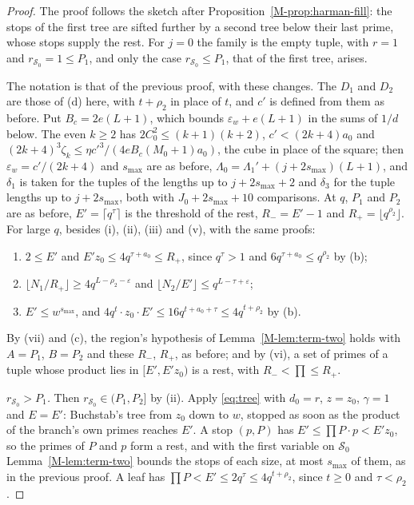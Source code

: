 \documentclass[11pt]{article}
\numberwithin{equation}{section}
\begin{document}
\begin{proof}
The proof follows the sketch after Proposition~\ref{M-prop:harman-fill}: the stops of the first tree are sifted
further by a second tree below their last prime, whose stops supply the rest. For $j = 0$ the family is the empty
tuple, with $r = 1$ and $r_{\mathcal S_0} = 1 \le P_1$, and only the case $r_{\mathcal S_0} \le P_1$, that of the first
tree, arises.

The notation is that of the previous proof, with these changes. The $D_1$ and $D_2$ are those of (d) here, with $t +
\rho_2$ in place of $t$, and $c'$ is defined from them as before. Put $B_c = 2e(L + 1)$, which bounds $\varepsilon_w +
e(L + 1)$ in the sums of $1/d$ below. The even $k \ge 2$ has $2C_0^2
\le (k + 1)(k + 2)$, $c' < (2k + 4)a_0$ and $(2k + 4)^3 \zeta_k \le \eta c'^3/(4eB_c(M_0 + 1)a_0)$, the cube in place of
the square; then $\varepsilon_w = c'/(2k + 4)$ and $s_{\max}$ are as before, $\Lambda_0 = \Lambda_1' + (j + 2s_{\max})(L
+ 1)$, and $\delta_1$ is taken for the tuples of the lengths up to $j + 2s_{\max} + 2$ and $\delta_3$ for the tuple
lengths up to $j + 2s_{\max}$, both with $J_0 + 2s_{\max} + 10$ comparisons. At $q$, $P_1$ and $P_2$ are as before, $E'
=
\lceil q^\tau \rceil$ is the threshold of the rest, $R_- = E' - 1$ and $R_+ = \lfloor q^{\rho_2} \rfloor$. For large
$q$, besides (i), (ii), (iii) and (v), with the same proofs:
\begin{enumerate}
\item[(vi)] $2 \le E'$ and $E' z_0 \le 4q^{\tau + a_0} \le R_+$, since $q^\tau > 1$ and $6q^{\tau + a_0} \le q^{\rho_2}$
  by (b);
\item[(vii)] $\lfloor N_1/R_+ \rfloor \ge 4q^{L - \rho_2 - \varepsilon}$ and $\lfloor N_2/E' \rfloor \le q^{L - \tau +
  \varepsilon}$;
\item[(viii)] $E' \le w^{s_{\max}}$, and $4q^t \cdot z_0 \cdot E' \le 16 q^{t + a_0 + \tau} \le 4q^{t + \rho_2}$ by (b).
\end{enumerate}
By (vii) and (c), the region's hypothesis of Lemma~\ref{M-lem:term-two} holds with $A = P_1$, $B = P_2$ and these $R_-$,
$R_+$, as before; and by (vi), a set of primes of a tuple whose product lies in $[E', E' z_0)$ is a rest, with $R_- <
\prod \le R_+$.

\emph{$r_{\mathcal S_0} > P_1$.} Then $r_{\mathcal S_0} \in (P_1, P_2]$ by (ii). Apply \eqref{eq:tree} with $d_0 = r$,
$z = z_0$, $\gamma = 1$ and $E = E'$: Buchstab's tree from $z_0$ down to $w$, stopped as soon as the product of the
branch's own primes reaches $E'$. A stop $(p, P)$ has $E' \le \prod P \cdot p < E' z_0$, so the primes of $P$ and $p$
form a rest, and with the first variable on $\mathcal S_0$ Lemma~\ref{M-lem:term-two} bounds the stops of each size, at
most $s_{\max}$ of them, as in the previous proof. A leaf has $\prod P < E' \le 2q^\tau \le 4q^{t + \rho_2}$, since $t
\ge 0$ and $\tau < \rho_2$.


\end{proof}
\end{document}

